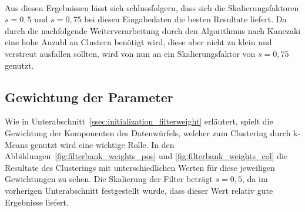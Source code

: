 \paragraph{}
Aus diesen Ergebnissen lässt sich schlussfolgern, dass sich die Skalierungsfaktoren $s=0,5$ und $s=0,75$ bei diesen Eingabedaten die besten Resultate liefert. Da durch die nachfolgende Weiterverarbeitung durch den Algorithmus nach Kanezaki eine hohe Anzahl an Clustern benötigt wird, diese aber nicht zu klein und verstreut ausfallen sollten, wird von nun an ein Skalierungsfaktor von $s=0,75$ genutzt.

\subsection{Gewichtung der Parameter}
\label{ssec:exp_filterweight}

Wie in Unterabschnitt~\ref{ssec:initialization_filterweight} erläutert, spielt die Gewichtung der Komponenten des Datenwürfels, welcher zum Clustering durch k-Means genutzt wird eine wichtige Rolle. In den Abbildungen~\ref{fig:filterbank_weights_pos} und \ref{fig:filterbank_weights_col} die Resultate des Clusterings mit unterschiedlichen Werten für diese jeweiligen Gewichtungen zu sehen. Die Skalierung der Filter beträgt $s=0,5$, da im vorherigen Unterabschnitt festgestellt wurde, dass dieser Wert relativ gute Ergebnisse liefert.

